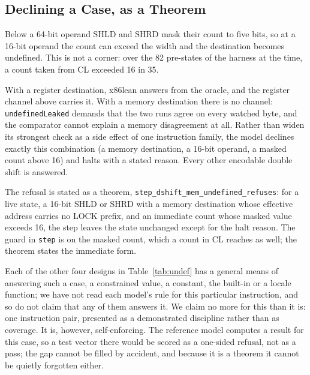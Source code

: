 \documentclass[runningheads]{llncs}
\newcommand{\src}[1]{}  %
\newcommand{\lean}[1]{\texttt{#1}}
\begin{document}
\subsection{Declining a Case, as a Theorem}
\label{sec:undef:refusal}

Below a 64-bit operand SHLD and SHRD mask their count to five bits, so at a 16-bit operand the count can
exceed the width and the destination becomes undefined. This is not a corner: over the 82 pre-states of the harness at the
time, a count taken from CL exceeded 16 in 35.
\src{docs/DECISIONS.md D52, measured on the reference model before the constructor existed; D52's ``five bits (six at .q)''; docs/CLAIMS.tsv[d52\_prestates, d52\_count\_over16]}
With a register destination, x86lean answers from the oracle, and the register channel above carries
it. With a memory destination there is no channel: \lean{undefinedLeaked} demands that the two runs
agree on every watched byte, and the comparator cannot explain a memory disagreement at all. Rather than
widen its strongest check as a side effect of one instruction family, the model declines exactly this
combination (a memory destination, a 16-bit operand, a masked count above 16) and halts with a stated
reason. Every other encodable double shift is answered.
\src{X86/Syntax.lean dshiftMemUndefined; X86/Semantics.lean, the .dshift case}

The refusal is stated as a theorem,
\lean{step\_dshift\_mem\_\allowbreak undefined\_\allowbreak refuses}: for a live state, a 16-bit SHLD or SHRD with a memory destination whose effective address carries no LOCK prefix, and an immediate count whose masked value exceeds 16, the step leaves the state unchanged except for the halt reason. The guard in \lean{step} is on the masked count, which a count in CL reaches as well; the theorem states the immediate form.
\src{X86/Theorems.lean step\_dshift\_mem\_undefined\_refuses}
Each of the other four designs in Table~\ref{tab:undef} has a general means of answering such a case,
a constrained value, a constant, the built-in or a locale function; we have not read each model's rule for this
particular instruction, and so do not claim that any of them answers it. We claim no more for this than it is: one
instruction pair, presented as a demonstrated discipline rather than as coverage. It is, however,
self-enforcing. The reference model computes a result for this case, so a test vector there would be
scored as a one-sided refusal, not as a pass; the gap cannot be filled by accident, and because it is a
theorem it cannot be quietly forgotten either.
\src{docs/DECISIONS.md D52}
\end{document}
